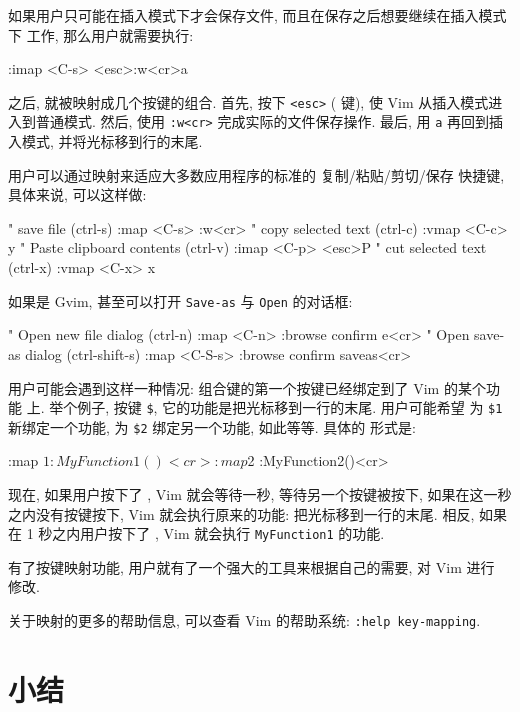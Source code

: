 如果用户只可能在插入模式下才会保存文件, 而且在保存之后想要继续在插入模式下
工作, 那么用户就需要执行:
\begin{vimcmd}
:imap <C-s> <esc>:w<cr>a
\end{vimcmd}

之后,  就被映射成几个按键的组合. 首先, 按下 \texttt{<esc>}
( 键), 使 Vim 从插入模式进入到普通模式. 然后, 使用 
\texttt{:w<cr>} 完成实际的文件保存操作. 最后, 用 \texttt{a} 再回到插入模式,
并将光标移到行的末尾.

用户可以通过映射来适应大多数应用程序的标准的 复制/粘贴/剪切/保存 快捷键,
具体来说, 可以这样做:
\begin{vimscript}
" save file (ctrl-s)
:map <C-s> :w<cr>
" copy selected text (ctrl-c)
:vmap <C-c> y
" Paste clipboard contents (ctrl-v)
:imap <C-p> <esc>P
" cut selected text (ctrl-x)
:vmap <C-x> x
\end{vimscript}

如果是 Gvim, 甚至可以打开 \texttt{Save-as} 与 \texttt{Open} 的对话框:
\begin{vimscript}
" Open new file dialog (ctrl-n)
:map <C-n> :browse confirm e<cr>
" Open save-as dialog (ctrl-shift-s)
:map <C-S-s> :browse confirm saveas<cr>
\end{vimscript}

用户可能会遇到这样一种情况: 组合键的第一个按键已经绑定到了 Vim 的某个功能
上. 举个例子, 按键 \verb'$', 它的功能是把光标移到一行的末尾. 用户可能希望 
为 \verb'$1' 新绑定一个功能, 为 \verb'$2' 绑定另一个功能, 如此等等. 具体的 
形式是:
\begin{vimscript}
:map $1 :MyFunction1()<cr>
:map $2 :MyFunction2()<cr>
\end{vimscript}

现在, 如果用户按下了 \key{\$}, Vim 就会等待一秒, 等待另一个按键被按下, 
如果在这一秒之内没有按键按下, Vim 就会执行原来的功能: 把光标移到一行的末尾.
相反, 如果在 1 秒之内用户按下了 , Vim 就会执行 \texttt{MyFunction1}
的功能.

有了按键映射功能, 用户就有了一个强大的工具来根据自己的需要, 对 Vim 进行 
修改.

\begin{tips}
    关于映射的更多的帮助信息, 可以查看 Vim 的帮助系统: \texttt{:help
    key-mapping}.
\end{tips}
\section{小结}
\label{sec:personalizing_vim_summary}

